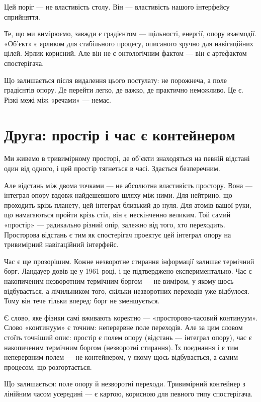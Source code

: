 \documentclass[12pt, a4paper, openany]{book}
\begin{document}
Цей поріг — не властивість столу. Він — властивість нашого інтерфейсу сприйняття.

Те, що ми вимірюємо, завжди є градієнтом — щільності, енергії, опору взаємодії. «Об'єкт» є ярликом для стабільного процесу, описаного зручно для навігаційних цілей. Ярлик корисний. Але він не є онтологічним фактом — він є артефактом спостерігача.

Що залишається після видалення цього постулату: не порожнеча, а поле градієнтів опору. Де перейти легко, де важко, де практично неможливо. Це є. Різкі межі між «речами» — немає.

\section{Друга: простір і час є контейнером}

Ми живемо в тривимірному просторі, де об'єкти знаходяться на певній відстані один від одного, і цей простір тягнеться в часі. Здається безперечним.

Але відстань між двома точками — не абсолютна властивість простору. Вона — інтеграл опору вздовж найдешевшого шляху між ними. Для нейтрино, що проходить крізь планету, цей інтеграл близький до нуля. Для атомів вашої руки, що намагаються пройти крізь стіл, він є нескінченно великим. Той самий «простір» — радикально різний опір, залежно від того, хто переходить. Просторова відстань є тим як спостерігач проектує цей інтеграл опору на тривимірний навігаційний інтерфейс.

Час є ще прозорішим. Кожне незворотне стирання інформації залишає термічний борг. Ландауер довів це у 1961 році, і це підтверджено експериментально. Час є накопиченим незворотним термічним боргом — не виміром, у якому щось відбувається, а лічильником того, скільки незворотних переходів уже відбулося. Тому він тече тільки вперед: борг не зменшується.

Є слово, яке фізики самі вживають коректно — «просторово-часовий континуум». Слово «континуум» є точним: неперервне поле переходів. Але за цим словом стоїть точніший опис: простір є полем опору (відстань — інтеграл опору), час є накопиченим термічним боргом (незворотні стирання). Їх поєднання і є тим неперервним полем — не контейнером, у якому щось відбувається, а самим процесом, що розгортається.

Що залишається: поле опору й незворотні переходи. Тривимірний контейнер з лінійним часом усередині — є картою, корисною для певного типу спостерігача.
\end{document}
